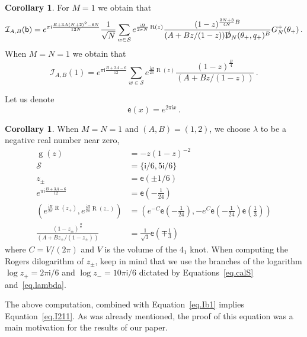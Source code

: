 \documentclass[12pt]{amsart}
\theoremstyle{definition}
\newtheorem{corollary}[theorem]{Corollary}
\def\calI{\mathcal I}
\def\th{\theta}
\def\calS{\mathcal{S}}
\newcommand{\im}{\mathsf{i}}
\begin{document}
\begin{corollary}
\label{cor.1}
For $M=1$ we obtain that
\begin{equation}
\label{eq.IbN}
\calI_{A,B}(\mathsf{b})=
e^{\pi\im \frac{B+3 A (N+2)^2-6N}{12 N}} 
\frac{1}{\sqrt{N}}
\sum_{w \in \calS}
e^{\frac{\im B}{2\pi N}\operatorname{R}(z)}
\frac{(1-z)^{\frac{2N+3}{4N}B}}{
(A+B z/(1-z)) \slashed{\operatorname{D}}_N(\th_+,q_+)^{B}}  
G^+_N(\th_+) \,.
\end{equation}
When $M=N=1$ we obtain that
\begin{equation}
\label{eq.Ib1}
\calI_{A,B}(1)=
e^{\pi\im \frac{B+3 A -6}{12}} 
\sum_{w \in \calS}
e^{\frac{\im B}{2\pi}\operatorname{R}(z)}
\frac{(1-z)^{\frac{B}{4}}}{(A+B z/(1-z))} \,.
\end{equation}
\end{corollary}

Let us denote
\begin{equation}
\label{eq.ex}
\mathsf{e}(x)=e^{2 \pi \im x} \,.
\end{equation}

\begin{corollary}
\label{cor.41.b=1}
When $M=N=1$ and $(A,B)=(1,2)$, we choose $\lambda$ to be a negative real
number near zero,
\begin{align*}
\operatorname{g}(z) &=-z(1-z)^{-2} \\
\calS &= \{\im /6, 5 \im /6 \} \\
z_\pm &= \mathsf{e}(\pm1/6)\\
e^{\pi\im \frac{B+3 A -6}{12}} &= \mathsf{e}\left(-\frac{1}{24}\right) \\
(e^{\frac{\im B}{2\pi}\operatorname{R} (z_+)} ,
e^{\frac{\im B}{2\pi}\operatorname{R} (z_-)} )
&= \left(e^{-C} \mathsf{e}\left(-\frac{1}{24}\right),
- e^{C} \mathsf{e}\left(-\frac{1}{24}\right) 
\mathsf{e}\left(\frac{1}{3}\right) \right)
\\
\frac{(1-z_\pm)^{\frac{B}{4}}}{(A+B z_\pm/(1-z_\pm))}
&=\frac{1}{\sqrt{3}} \mathsf{e}\left(\mp \frac{1}{3}\right)
\end{align*}
where $C=V/(2\pi)$ and $V$ is the volume of the $4_1$ knot. 
When computing the Rogers dilogarithm of $z_\pm$, keep in mind that we
use the branches of the logarithm
$\log z_+= 2 \pi \im/6$ and $\log z_-= 10 \pi \im/6$ dictated by
Equations~\eqref{eq.calS} and~\eqref{eq.lambda}.

The above computation, combined with Equation~\eqref{eq.Ib1} implies 
Equation~\eqref{eq.I211}. As was already mentioned, the proof
of this equation was a main motivation for the results of our paper.
\end{corollary}
\end{document}

